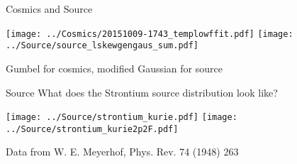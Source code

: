 \documentclass[compress,8pt]{beamer} %
\begin{document}
\begin{frame}{Cosmics and Source}
\begin{adjustwidth}{-2em}{-2em}
\begin{center}
\texttt{[image: ../Cosmics/20151009-1743\_templowffit.pdf]}
\texttt{[image: ../Source/source\_lskewgengaus\_sum.pdf]}
\end{center}
\end{adjustwidth}
Gumbel for cosmics, modified Gaussian for source
\end{frame}



\begin{frame}{Source}
What does the Strontium source distribution look like?
\begin{adjustwidth}{-2em}{-2em}
\begin{center}
\texttt{[image: ../Source/strontium\_kurie.pdf]}
\texttt{[image: ../Source/strontium\_kurie2p2F.pdf]}
\end{center}
\end{adjustwidth}
Data from W. E. Meyerhof, Phys. Rev. 74 (1948) 263
\end{frame}
\end{document}
